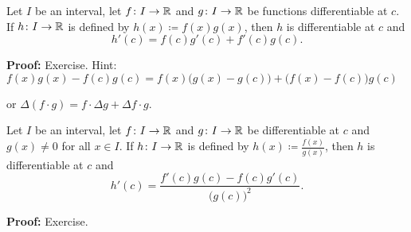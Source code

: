 \documentclass[10pt,aspectratio=169]{beamer}
\begin{document}
\begin{frame}

\begin{proposition}
Let $I$ be an interval, let
$f \colon I \to {\mathbb{R}}$ and $g \colon I \to {\mathbb{R}}$ be 
functions differentiable at $c$.  If $h \colon I \to {\mathbb{R}}$
is defined by
$h(x) \coloneqq f(x) g(x)$,
\pause
then $h$ is differentiable at $c$ and
\begin{equation*}
h'(c) = f(c) g'(c) + f'(c) g(c) .
\end{equation*}
\end{proposition}

\pause

\textbf{Proof:} Exercise.
\pause
Hint: 
$f(x) g(x) - f(c) g(c) =
f(x)\bigl( g(x) - g(c) \bigr)
+ \bigl( f(x) - f(c) \bigr) g(c)$

\pause

or \qquad
$\Delta (f \cdot g) = f \cdot \Delta g + \Delta f \cdot g$.

\pause
\begin{center}
\end{center}

\end{frame}

\begin{frame}

\begin{proposition}
Let $I$ be an interval, let
$f \colon I \to {\mathbb{R}}$ and $g \colon I \to {\mathbb{R}}$ be differentiable at $c$
and $g(x) \not= 0$ for all $x \in I$.
If $h \colon I \to {\mathbb{R}}$
is defined by
$h(x) \coloneqq \frac{f(x)}{g(x)}$,
\pause
then $h$ is differentiable at $c$ and
\begin{equation*}
h'(c) = \frac{f'(c) g(c) - f(c) g'(c)}{{\bigl(g(c)\bigr)}^2} .
\end{equation*}
\end{proposition}

\pause

\textbf{Proof:}  Exercise.

\end{frame}
\end{document}
